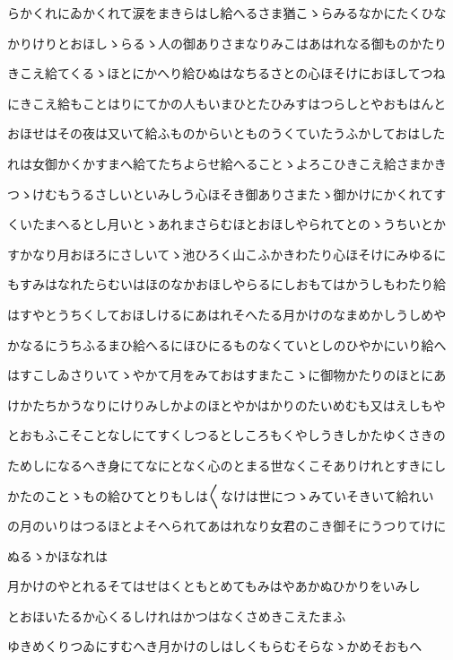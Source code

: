 \documentclass[a4paper,11pt,landscape]{ltjtarticle}
\begin{document}
\par\medskip
らかくれにゐかくれて涙をまきらはし給へるさま猶こゝらみるなかにたくひな
\par\medskip
かりけりとおほしゝらるゝ人の御ありさまなりみこはあはれなる御ものかたり
\par\medskip
きこえ給てくるゝほとにかへり給ひぬはなちるさとの心ほそけにおほしてつね
\par\medskip
にきこえ給もことはりにてかの人もいまひとたひみすはつらしとやおもはんと
\par\medskip
おほせはその夜は又いて給ふものからいとものうくていたうふかしておはした
\par\medskip
れは女御かくかすまへ給てたちよらせ給へることゝよろこひきこえ給さまかき
\par\medskip
つゝけむもうるさしいといみしう心ほそき御ありさまたゝ御かけにかくれてす
\par\medskip
くいたまへるとし月いとゝあれまさらむほとおほしやられてとのゝうちいとか
\par\medskip
すかなり月おほろにさしいてゝ池ひろく山こふかきわたり心ほそけにみゆるに
\par\medskip
もすみはなれたらむいはほのなかおほしやらるにしおもてはかうしもわたり給
\par\medskip
はすやとうちくしておほしけるにあはれそへたる月かけのなまめかしうしめや
\par\medskip
かなるにうちふるまひ給へるにほひにるものなくていとしのひやかにいり給へ
\par\medskip
はすこしゐさりいてゝやかて月をみておはすまたこゝに御物かたりのほとにあ
\par\medskip
けかたちかうなりにけりみしかよのほとやかはかりのたいめむも又はえしもや
\par\medskip
とおもふこそことなしにてすくしつるとしころもくやしうきしかたゆくさきの
\par\medskip
ためしになるへき身にてなにとなく心のとまる世なくこそありけれとすきにし
\par\medskip
かたのことゝもの給ひてとりもしは〱なけは世につゝみていそきいて給れい
\par\medskip
の月のいりはつるほとよそへられてあはれなり女君のこき御そにうつりてけに
\par\medskip
ぬるゝかほなれは
\par\medskip
月かけのやとれるそてはせはくともとめてもみはやあかぬひかりをいみし
\par\medskip
とおほいたるか心くるしけれはかつはなくさめきこえたまふ
\par\medskip
ゆきめくりつゐにすむへき月かけのしはしくもらむそらなゝかめそおもへ
\end{document}

